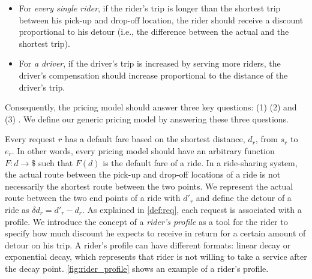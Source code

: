 \begin{itemize}
\item For \textit{every single rider}, if the rider's trip is longer than the shortest trip between his pick-up and drop-off location, the rider should receive a discount proportional to his detour (i.e., the difference between the actual and the shortest trip).
\item For \textit{a driver}, if the driver's trip is increased by serving more riders, the driver's compensation should increase proportional to the distance of the driver's trip.
\end{itemize}

Consequently, the pricing model should answer three key questions: (1)  (2)  and (3) . We define our generic pricing model by answering these three questions.

Every request $r$ has a default fare based on the shortest distance, $d_r$, from $s_r$ to $e_r$. In other words, every pricing model should have an arbitrary function $F: d \rightarrow \$ $ such that $F(d)$ is the default fare of a ride. In a ride-sharing system, the actual route between the pick-up and drop-off locations of a ride is not necessarily the shortest route between the two points. We represent the actual route between the two end points of a ride with $d'_r$ and define the detour of a ride as $\delta d_r = d'_r - d_r$. As explained in \cref{def:req}, each request is associated with a profile. We introduce the concept of a \textit{rider's profile} as a tool for the rider to specify how much discount he expects to receive in return for a certain amount of detour on his trip. A rider's profile can have different formats: linear decay or exponential decay, which represents that rider is not willing to  take a service after the decay point. \cref{fig:rider_profile} shows an example of a rider's profile.

